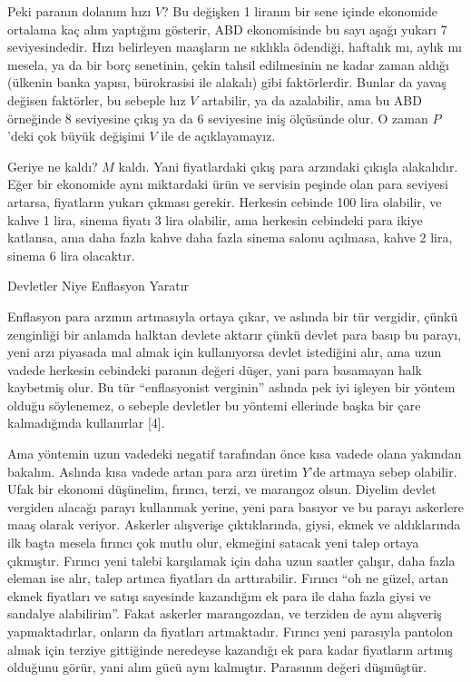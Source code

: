 \documentclass[12pt,fleqn]{article}\usepackage{../../common}
\begin{document}
Peki paranın dolanım hızı $V$? Bu değişken 1 liranın bir sene içinde
ekonomide ortalama kaç alım yaptığını gösterir, ABD ekonomisinde bu sayı
aşağı yukarı 7 seviyesindedir. Hızı belirleyen maaşların ne sıklıkla
ödendiği, haftalık mı, aylık mı mesela, ya da bir borç senetinin, çekin
tahsil edilmesinin ne kadar zaman aldığı (ülkenin banka yapısı, bürokrasisi
ile alakalı) gibi faktörlerdir. Bunlar da yavaş değisen faktörler, bu
sebeple hız $V$ artabilir, ya da azalabilir, ama bu ABD örneğinde 8
seviyesine çıkış ya da 6 seviyesine iniş ölçüsünde olur. O zaman $P$'deki
çok büyük değişimi $V$ ile de açıklayamayız. 

Geriye ne kaldı? $M$ kaldı. Yani fiyatlardaki çıkış para arzındaki çıkışla
alakalıdır. Eğer bir ekonomide aynı miktardaki ürün ve servisin peşinde
olan para seviyesi artarsa, fiyatların yukarı çıkması gerekir. Herkesin
cebinde 100 lira olabilir, ve kahve 1 lira, sinema fiyatı 3 lira olabilir,
ama herkesin cebindeki para ikiye katlansa, ama daha fazla kahve daha fazla
sinema salonu açılmasa, kahve 2 lira, sinema 6 lira olacaktır. 

Devletler Niye Enflasyon Yaratır

Enflasyon para arzının artmasıyla ortaya çıkar, ve aslında bir tür
vergidir, çünkü zenginliği bir anlamda halktan devlete aktarır çünkü devlet
para basıp bu parayı, yeni arzı piyasada mal almak için kullanıyorsa devlet
istediğini alır, ama uzun vadede herkesin cebindeki paranın değeri düşer,
yani para basamayan halk kaybetmiş olur. Bu tür ``enflasyonist verginin''
aslında pek iyi işleyen bir yöntem olduğu söylenemez, o sebeple devletler
bu yöntemi ellerinde başka bir çare kalmadığında kullanırlar [4].

Ama yöntemin uzun vadedeki negatif tarafından önce kısa vadede olana
yakından bakalım. Aslında kısa vadede artan para arzı üretim $Y$'de artmaya
sebep olabilir. Ufak bir ekonomi düşünelim, fırıncı, terzi, ve marangoz
olsun. Diyelim devlet vergiden alacağı parayı kullanmak yerine, yeni para
basıyor ve bu parayı askerlere maaş olarak veriyor. Askerler alışverişe
çıktıklarında, giysi, ekmek ve aldıklarında ilk başta mesela fırıncı çok
mutlu olur, ekmeğini satacak yeni talep ortaya çıkmıştır. Fırıncı yeni
talebi karşılamak için daha uzun saatler çalışır, daha fazla eleman ise
alır, talep artınca fiyatları da arttırabilir. Fırıncı ``oh ne güzel, artan
ekmek fiyatları ve satışı sayesinde kazandığım ek para ile daha fazla giysi
ve sandalye alabilirim''. Fakat askerler marangozdan, ve terziden de aynı
alışveriş yapmaktadırlar, onların da fiyatları artmaktadır. Fırıncı yeni
parasıyla pantolon almak için terziye gittiğinde neredeyse kazandığı ek
para kadar fiyatların artmış olduğunu görür, yani alım gücü aynı
kalmıştır. Parasının değeri düşmüştür.
\end{document}
